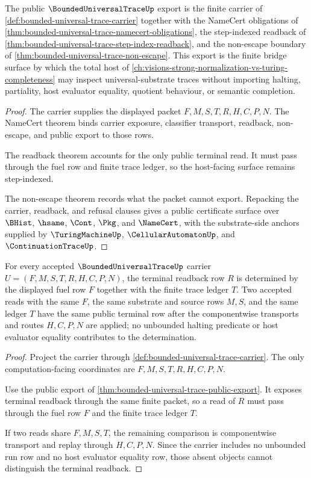 \begin{theorem}
\label{thm:bounded-universal-trace-public-export}
The public $\BoundedUniversalTraceUp$ export is the finite carrier of \autoref{def:bounded-universal-trace-carrier} together with the NameCert obligations of \autoref{thm:bounded-universal-trace-namecert-obligations}, the step-indexed readback of \autoref{thm:bounded-universal-trace-step-index-readback}, and the non-escape boundary of \autoref{thm:bounded-universal-trace-non-escape}. This export is the finite bridge surface by which the total host of \autoref{ch:visions-strong-normalization-vs-turing-completeness} may inspect universal-substrate traces without importing halting, partiality, host evaluator equality, quotient behaviour, or semantic completion.
\end{theorem}
\begin{proof}
The carrier supplies the displayed packet $F,M,S,T,R,H,C,P,N$. The NameCert theorem binds carrier exposure, classifier transport, readback, non-escape, and public export to those rows.

The readback theorem accounts for the only public terminal read. It must pass through the fuel row and finite trace ledger, so the host-facing surface remains step-indexed.

The non-escape theorem records what the packet cannot export. Repacking the carrier, readback, and refusal clauses gives a public certificate surface over $\BHist$, $\hsame$, $\Cont$, $\Pkg$, and $\NameCert$, with the substrate-side anchors supplied by $\TuringMachineUp$, $\CellularAutomatonUp$, and $\ContinuationTraceUp$.
\end{proof}

\begin{theorem}
\label{thm:bounded-universal-trace-fuel-determinacy}
For every accepted $\BoundedUniversalTraceUp$ carrier $U=(F,M,S,T,R,H,C,P,N)$, the terminal readback row $R$ is determined by the displayed fuel row $F$ together with the finite trace ledger $T$. Two accepted reads with the same $F$, the same substrate and source rows $M,S$, and the same ledger $T$ have the same public terminal row after the componentwise transports and routes $H,C,P,N$ are applied; no unbounded halting predicate or host evaluator equality contributes to the determination.
\end{theorem}
\begin{proof}
Project the carrier through \autoref{def:bounded-universal-trace-carrier}. The only computation-facing coordinates are $F,M,S,T,R,H,C,P,N$.

Use the public export of \autoref{thm:bounded-universal-trace-public-export}. It exposes terminal readback through the same finite packet, so a read of $R$ must pass through the fuel row $F$ and the finite trace ledger $T$.

If two reads share $F,M,S,T$, the remaining comparison is componentwise transport and replay through $H,C,P,N$. Since the carrier includes no unbounded run row and no host evaluator equality row, those absent objects cannot distinguish the terminal readback.
\end{proof}

